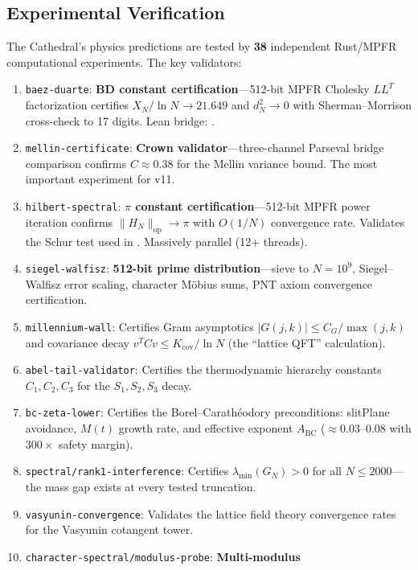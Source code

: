 \documentclass[11pt,a4paper]{article}
\begin{document}
\subsection{Experimental Verification}

The Cathedral's physics predictions are tested by \textbf{38} independent
Rust/MPFR computational experiments. The key validators:
\begin{enumerate}
  \item \texttt{baez-duarte}: \textbf{BD constant certification}---512-bit
    MPFR Cholesky $LL^T$ factorization certifies $X_N/\ln N \to 21.649$
    and $d_N^2 \to 0$ with Sherman--Morrison cross-check to 17 digits.
    Lean bridge: .
  \item \texttt{mellin-certificate}: \textbf{Crown validator}---three-channel
    Parseval bridge comparison confirms $C \approx 0.38$ for the Mellin
    variance bound. The most important experiment for v11.
  \item \texttt{hilbert-spectral}: \textbf{$\pi$ constant certification}---512-bit
    MPFR power iteration confirms $\|H_N\|_{\mathrm{op}} \to \pi$ with
    $O(1/N)$ convergence rate. Validates the Schur test used in
    . Massively parallel (12+ threads).
  \item \texttt{siegel-walfisz}: \textbf{512-bit prime distribution}---sieve
    to $N = 10^9$, Siegel--Walfisz error scaling, character M\"obius sums,
    PNT axiom convergence certification.
  \item \texttt{millennium-wall}: Certifies Gram asymptotics
    $|G(j,k)| \leq C_G/\max(j,k)$ and covariance decay
    $v^T C v \leq K_{\mathrm{cov}}/\ln N$ (the ``lattice QFT'' calculation).
  \item \texttt{abel-tail-validator}: Certifies the thermodynamic
    hierarchy constants $C_1, C_2, C_3$ for the $S_1, S_2, S_3$ decay.
  \item \texttt{bc-zeta-lower}: Certifies the Borel--Carath\'eodory
    preconditions: slitPlane avoidance, $M(t)$ growth rate, and
    effective exponent $A_{\mathrm{BC}}$ ($\approx 0.03$--$0.08$ with
    $300\times$ safety margin).
  \item \texttt{spectral/rank1-interference}: Certifies
    $\lambda_{\min}(G_N) > 0$ for all $N \leq 2000$---the mass gap
    exists at every tested truncation.
  \item \texttt{vasyunin-convergence}: Validates the lattice field theory
    convergence rates for the Vasyunin cotangent tower.
  \item \texttt{character-spectral/modulus-probe}: \textbf{Multi-modulus
}
\end{enumerate}
\end{document}
